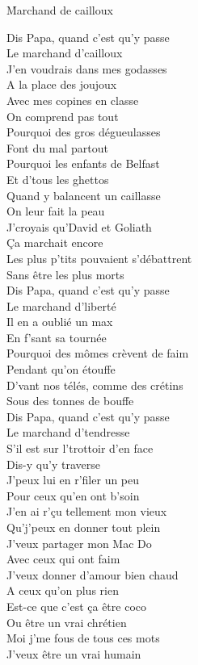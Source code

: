 \documentclass{novel}
\begin{document}
\h*{Marchand de cailloux}
\begin{multicols}{2}
Dis Papa, quand c'est qu'y passe \\
Le marchand d'cailloux \\
J'en voudrais dans mes godasses \\
A la place des joujoux \\

Avec mes copines en classe \\
On comprend pas tout \\
Pourquoi des gros dégueulasses \\
Font du mal partout \\
Pourquoi les enfants de Belfast \\
Et d'tous les ghettos \\
Quand y balancent un caillasse \\
On leur fait la peau \\
J'croyais qu'David et Goliath \\
Ça marchait encore \\
Les plus p'tits pouvaient s'débattrent \\
Sans être les plus morts \\

Dis Papa, quand c'est qu'y passe \\
Le marchand d'liberté \\
Il en a oublié un max \\
En f'sant sa tournée \\
Pourquoi des mômes crèvent de faim \\
Pendant qu'on étouffe \\
D'vant nos télés, comme des crétins \\
Sous des tonnes de bouffe \\

Dis Papa, quand c'est qu'y passe \\
Le marchand d'tendresse \\
S'il est sur l'trottoir d'en face \\
Dis-y qu'y traverse \\
J'peux lui en r'filer un peu \\
Pour ceux qu'en ont b'soin \\
J'en ai r'çu tellement mon vieux \\
Qu'j'peux en donner tout plein \\
J'veux partager mon Mac Do \\
Avec ceux qui ont faim \\
J'veux donner d'amour bien chaud \\
A ceux qu'on plus rien \\
Est-ce que c'est ça être coco \\
Ou être un vrai chrétien \\
Moi j'me fous de tous ces mots \\
J'veux être un vrai humain \\


\end{multicols}
\end{document}
